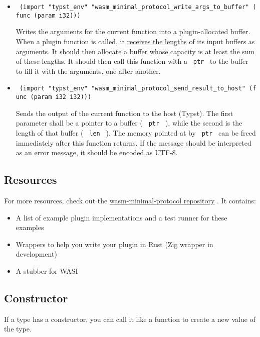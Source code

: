 \begin{itemize}
\item
  \texttt{\ (import\ "typst\_env"\ "wasm\_minimal\_protocol\_write\_args\_to\_buffer"\ (func\ (param\ i32)))\ }

  Writes the arguments for the current function into a plugin-allocated
  buffer. When a plugin function is called, it
  \hyperref[exports]{receives the lengths} of its input buffers as
  arguments. It should then allocate a buffer whose capacity is at least
  the sum of these lengths. It should then call this function with a
  \texttt{\ ptr\ } to the buffer to fill it with the arguments, one
  after another.
\item
  \texttt{\ (import\ "typst\_env"\ "wasm\_minimal\_protocol\_send\_result\_to\_host"\ (func\ (param\ i32\ i32)))\ }

  Sends the output of the current function to the host (Typst). The
  first parameter shall be a pointer to a buffer ( \texttt{\ ptr\ } ),
  while the second is the length of that buffer ( \texttt{\ len\ } ).
  The memory pointed at by \texttt{\ ptr\ } can be freed immediately
  after this function returns. If the message should be interpreted as
  an error message, it should be encoded as UTF-8.
\end{itemize}

\subsection{Resources}\label{resources}

For more resources, check out the
\href{https://github.com/astrale-sharp/wasm-minimal-protocol}{wasm-minimal-protocol
repository} . It contains:

\begin{itemize}
\tightlist
\item
  A list of example plugin implementations and a test runner for these
  examples
\item
  Wrappers to help you write your plugin in Rust (Zig wrapper in
  development)
\item
  A stubber for WASI
\end{itemize}

\subsection{\texorpdfstring{Constructor
{}}{Constructor }}\label{constructor}

\label{constructor-constructor-tooltip}
If a type has a constructor, you can call it like a function to create a
new value of the type.

